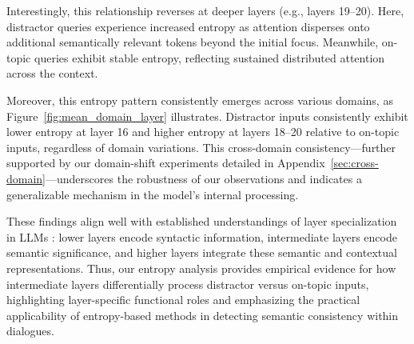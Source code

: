 \documentclass[11pt]{article}
\begin{document}
Interestingly, this relationship reverses at deeper layers (e.g., layers 19–20). Here, distractor queries experience increased entropy as attention disperses onto additional semantically relevant tokens beyond the initial focus. Meanwhile, on-topic queries exhibit stable entropy, reflecting sustained distributed attention across the context.

Moreover, this entropy pattern consistently emerges across various domains, as Figure~\ref{fig:mean_domain_layer} illustrates. Distractor inputs consistently exhibit lower entropy at layer 16 and higher entropy at layers 18–20 relative to on-topic inputs, regardless of domain variations. This cross-domain consistency—further supported by our domain-shift experiments detailed in Appendix~\ref{sec:cross-domain}—underscores the robustness of our observations and indicates a generalizable mechanism in the model’s internal processing.

These findings align well with established understandings of layer specialization in LLMs \cite{gera-etal-2023-benefits}: lower layers encode syntactic information, intermediate layers encode semantic significance, and higher layers integrate these semantic and contextual representations. Thus, our entropy analysis provides empirical evidence for how intermediate layers differentially process distractor versus on-topic inputs, highlighting layer-specific functional roles and emphasizing the practical applicability of entropy-based methods in detecting semantic consistency within dialogues.



\end{document}
